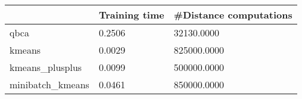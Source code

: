 \begin{table}[htbp]
\centering
\begin{tabular}{lll}
\toprule
 & Training time & #Distance computations \\
\midrule
qbca & 0.2506 & 32130.0000 \\
kmeans & 0.0029 & 825000.0000 \\
kmeans_plusplus & 0.0099 & 500000.0000 \\
minibatch_kmeans & 0.0461 & 850000.0000 \\
\bottomrule
\end{tabular}
\end{table}
